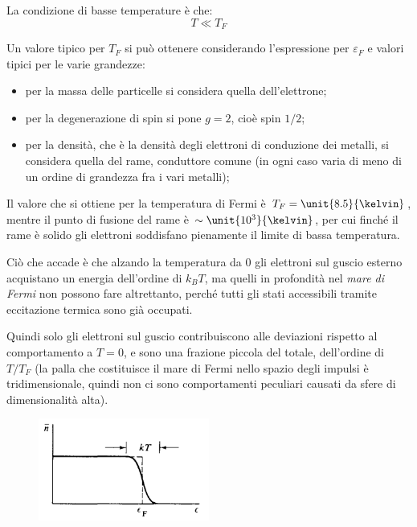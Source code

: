 La condizione di basse temperature è che:
\begin{equation*}
T \ll T_F
\end{equation*}

Un valore tipico per $T_F$ si può ottenere considerando l'espressione per $\varepsilon_F$ e valori tipici per le varie grandezze:
\begin{itemize}
	\item per la massa delle particelle si considera quella dell'elettrone;
	\item per la degenerazione di spin si pone $g=2$, cioè spin $1/2$;
	\item per la densità, che è la densità degli elettroni di conduzione dei metalli, si considera quella del rame, conduttore comune (in ogni caso varia di meno di un ordine di grandezza fra i vari metalli);
\end{itemize}
Il valore che si ottiene per la temperatura di Fermi è $T_F = \unit{8.5}{\kelvin}$, mentre il punto di fusione del rame è $\sim \unit{10^3}{\kelvin}$, per cui finché il rame è solido gli elettroni soddisfano pienamente il limite di bassa temperatura.
\newline

Ciò che accade è che alzando la temperatura da $0$ gli elettroni sul guscio esterno acquistano un energia dell'ordine di $k_B T$, ma quelli in profondità nel \textit{mare di Fermi} non possono fare altrettanto, perché tutti gli stati accessibili tramite eccitazione termica sono già occupati.

Quindi solo gli elettroni sul guscio contribuiscono alle deviazioni rispetto al comportamento a $T=0$, e sono una frazione piccola del totale, dell'ordine di $T/T_F$ (la palla che costituisce il mare di Fermi nello spazio degli impulsi è tridimensionale, quindi non ci sono comportamenti peculiari causati da sfere di dimensionalità alta).

\begin{figure}[h!]
	\centering
	\includegraphics[width=0.5\textwidth]{Immagini/FStepT.png}
	\caption{}
	\label{fig:fstepT}
\end{figure}

